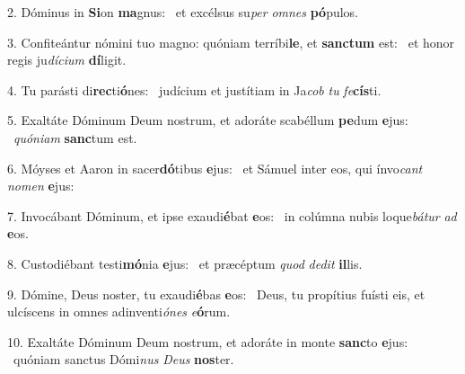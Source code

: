 2. Dóminus in \textbf{Si}on \textbf{ma}gnus: \ast\  et excélsus su\textit{per} \textit{om}\textit{nes} \textbf{pó}pulos.\

3. Confiteántur nómini tuo magno: quóniam terríbi\textbf{le}, et \textbf{sanc}\textbf{tum} est: \ast\  et honor regis ju\textit{dí}\textit{ci}\textit{um} \textbf{dí}ligit.\

4. Tu parásti di\textbf{rec}ti\textbf{ó}nes: \ast\  judícium et justítiam in Ja\textit{cob} \textit{tu} \textit{fe}\textbf{cís}ti.\

5. Exaltáte Dóminum Deum nostrum, et adoráte scabéllum \textbf{pe}dum \textbf{e}jus: \ast\  \textit{quón}\textit{i}\textit{am} \textbf{sanc}tum est.\

6. Móyses et Aaron in sacer\textbf{dó}tibus \textbf{e}jus: \ast\  et Sámuel inter eos, qui ínvo\textit{cant} \textit{no}\textit{men} \textbf{e}jus:\

7. Invocábant Dóminum, et ipse exaudi\textbf{é}bat \textbf{e}os: \ast\  in colúmna nubis loque\textit{bá}\textit{tur} \textit{ad} \textbf{e}os.\

8. Custodiébant testi\textbf{mó}nia \textbf{e}jus: \ast\  et præcéptum \textit{quod} \textit{de}\textit{dit} \textbf{il}lis.\

9. Dómine, Deus noster, tu exaudi\textbf{é}bas \textbf{e}os: \ast\  Deus, tu propítius fuísti eis, et ulcíscens in omnes adinventi\textit{ó}\textit{nes} \textit{e}\textbf{ó}rum.\

10. Exaltáte Dóminum Deum nostrum, et adoráte in monte \textbf{sanc}to \textbf{e}jus: \ast\  quóniam sanctus Dómi\textit{nus} \textit{De}\textit{us} \textbf{nos}ter.\

